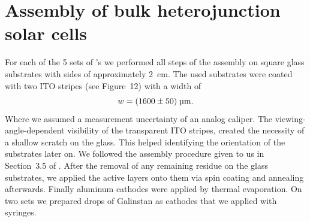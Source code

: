 \section{Assembly of bulk heterojunction solar cells}\label{sec:assembly}
For each of the 5 sets of \BHSC's we performed all steps of the assembly on square glass substrates with sides of approximately 2~cm. The used substrates were coated with two ITO stripes (see \cite{labdesc} Figure~12) with a width of
\begin{equation*}
w = (1600\pm50)\;\text{\textmu m}.
\end{equation*}
Where we assumed a measurement uncertainty of an analog caliper. The viewing-angle-dependent visibility of the transparent ITO stripes, created the necessity of a shallow scratch on the glass. This helped identifying the orientation of the substrates later on.\mypar
We followed the assembly procedure given to us in Section~3.5 of \cite{labdesc}. After the removal of any remaining residue on the glass substrates, we applied the active layers onto them via spin coating and annealing afterwards. Finally aluminum cathodes were applied by thermal evaporation. On two sets we prepared drops of Galinstan as cathodes that we applied with syringes.

